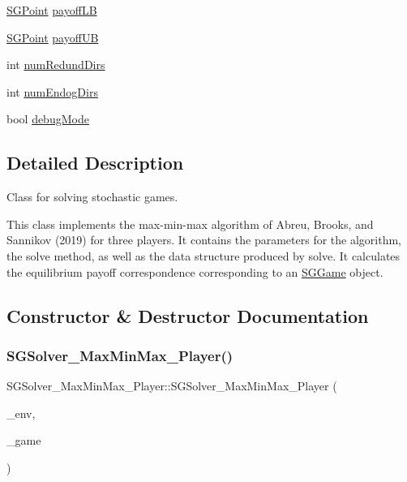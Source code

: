 \begin{DoxyCompactItemize}
\item 
\hyperlink{classSGPoint}{S\+G\+Point} \hyperlink{classSGSolver__MaxMinMax__3Player_aaaa7b99731c2675fa0d991937005e752}{payoff\+LB}
\item 
\hyperlink{classSGPoint}{S\+G\+Point} \hyperlink{classSGSolver__MaxMinMax__3Player_a3f908815bea40da7ad84ee437ef3511e}{payoff\+UB}
\item 
int \hyperlink{classSGSolver__MaxMinMax__3Player_a75becc64c5ebd6d18b1644372be7f0d6}{num\+Redund\+Dirs}
\item 
int \hyperlink{classSGSolver__MaxMinMax__3Player_acc47b9e01943a25c9939b22723c027e1}{num\+Endog\+Dirs}
\item 
bool \hyperlink{classSGSolver__MaxMinMax__3Player_a4be7e1fda2f279ba5845b68ad6a8b316}{debug\+Mode}
\end{DoxyCompactItemize}


\subsection{Detailed Description}
Class for solving stochastic games. 

This class implements the max-\/min-\/max algorithm of Abreu, Brooks, and Sannikov (2019) for three players. It contains the parameters for the algorithm, the solve method, as well as the data structure produced by solve. It calculates the equilibrium payoff correspondence corresponding to an \hyperlink{classSGGame}{S\+G\+Game} object. 

\subsection{Constructor \& Destructor Documentation}
\mbox{\label{classSGSolver__MaxMinMax__3Player_a6ce2ccd99ac00de13d16518e27f8d2ec}} 
\subsubsection{\texorpdfstring{S\+G\+Solver\+\_\+\+Max\+Min\+Max\+\_\+Player()}{SGSolver\_MaxMinMax\_3Player()}}
{\footnotesize\ttfamily S\+G\+Solver\+\_\+\+Max\+Min\+Max\+\_\+Player\+::\+S\+G\+Solver\+\_\+\+Max\+Min\+Max\+\_\+Player (\begin{DoxyParamCaption}\item[{const \hyperlink{classSGEnv}{S\+G\+Env} \&}]{\+\_\+env,  }\item[{const \hyperlink{classSGGame}{S\+G\+Game} \&}]{\+\_\+game }\end{DoxyParamCaption})}



